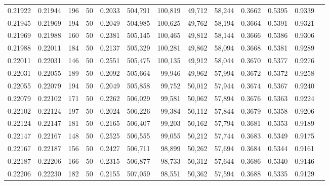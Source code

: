 \begin{tabular}{rrrrrrrrrrrrr}
0.21922 & 0.21944 &   196 &  50 &                                     0.2033 & 504,791 & 100,819 &  49,712 &  58,244 & 0.3662 & 0.5395 & 0.9339 \\
0.21945 & 0.21969 &   194 &  50 &                                     0.2049 & 504,985 & 100,625 &  49,762 &  58,194 & 0.3664 & 0.5391 & 0.9321 \\
0.21969 & 0.21988 &   160 &  50 &                                     0.2381 & 505,145 & 100,465 &  49,812 &  58,144 & 0.3666 & 0.5386 & 0.9306 \\
0.21988 & 0.22011 &   184 &  50 &                                     0.2137 & 505,329 & 100,281 &  49,862 &  58,094 & 0.3668 & 0.5381 & 0.9289 \\
0.22011 & 0.22031 &   146 &  50 &                                     0.2551 & 505,475 & 100,135 &  49,912 &  58,044 & 0.3670 & 0.5377 & 0.9276 \\
0.22031 & 0.22055 &   189 &  50 &                                     0.2092 & 505,664 &  99,946 &  49,962 &  57,994 & 0.3672 & 0.5372 & 0.9258 \\
0.22055 & 0.22079 &   194 &  50 &                                     0.2049 & 505,858 &  99,752 &  50,012 &  57,944 & 0.3674 & 0.5367 & 0.9240 \\
0.22079 & 0.22102 &   171 &  50 &                                     0.2262 & 506,029 &  99,581 &  50,062 &  57,894 & 0.3676 & 0.5363 & 0.9224 \\
0.22102 & 0.22124 &   197 &  50 &                                     0.2024 & 506,226 &  99,384 &  50,112 &  57,844 & 0.3679 & 0.5358 & 0.9206 \\
0.22124 & 0.22147 &   181 &  50 &                                     0.2165 & 506,407 &  99,203 &  50,162 &  57,794 & 0.3681 & 0.5353 & 0.9189 \\
0.22147 & 0.22167 &   148 &  50 &                                     0.2525 & 506,555 &  99,055 &  50,212 &  57,744 & 0.3683 & 0.5349 & 0.9175 \\
0.22167 & 0.22187 &   156 &  50 &                                     0.2427 & 506,711 &  98,899 &  50,262 &  57,694 & 0.3684 & 0.5344 & 0.9161 \\
0.22187 & 0.22206 &   166 &  50 &                                     0.2315 & 506,877 &  98,733 &  50,312 &  57,644 & 0.3686 & 0.5340 & 0.9146 \\
0.22206 & 0.22230 &   182 &  50 &                                     0.2155 & 507,059 &  98,551 &  50,362 &  57,594 & 0.3688 & 0.5335 & 0.9129 \\

\end{tabular}
